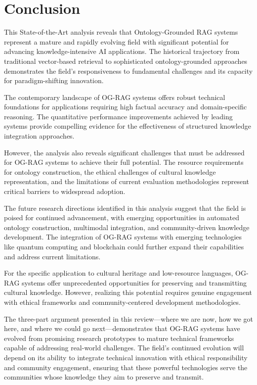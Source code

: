 \section{Conclusion}

This State-of-the-Art analysis reveals that Ontology-Grounded RAG systems represent a mature and rapidly evolving field with significant potential for advancing knowledge-intensive AI applications. The historical trajectory from traditional vector-based retrieval to sophisticated ontology-grounded approaches demonstrates the field's responsiveness to fundamental challenges and its capacity for paradigm-shifting innovation.

The contemporary landscape of OG-RAG systems offers robust technical foundations for applications requiring high factual accuracy and domain-specific reasoning. The quantitative performance improvements achieved by leading systems provide compelling evidence for the effectiveness of structured knowledge integration approaches.

However, the analysis also reveals significant challenges that must be addressed for OG-RAG systems to achieve their full potential. The resource requirements for ontology construction, the ethical challenges of cultural knowledge representation, and the limitations of current evaluation methodologies represent critical barriers to widespread adoption.

The future research directions identified in this analysis suggest that the field is poised for continued advancement, with emerging opportunities in automated ontology construction, multimodal integration, and community-driven knowledge development. The integration of OG-RAG systems with emerging technologies like quantum computing and blockchain could further expand their capabilities and address current limitations.

For the specific application to cultural heritage and low-resource languages, OG-RAG systems offer unprecedented opportunities for preserving and transmitting cultural knowledge. However, realizing this potential requires genuine engagement with ethical frameworks and community-centered development methodologies.

The three-part argument presented in this review—where we are now, how we got here, and where we could go next—demonstrates that OG-RAG systems have evolved from promising research prototypes to mature technical frameworks capable of addressing real-world challenges. The field's continued evolution will depend on its ability to integrate technical innovation with ethical responsibility and community engagement, ensuring that these powerful technologies serve the communities whose knowledge they aim to preserve and transmit.
